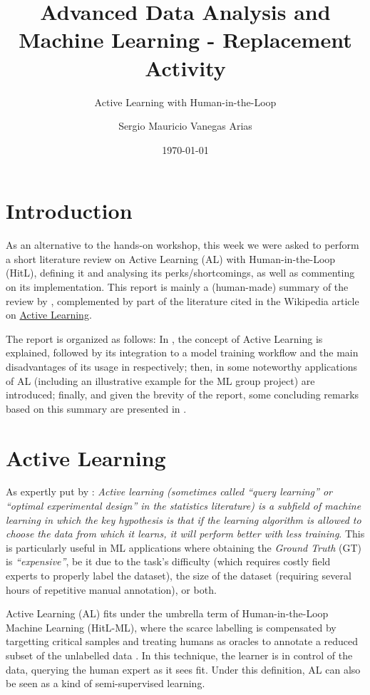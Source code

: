 \documentclass{scrartcl}
\title{Advanced Data Analysis and Machine Learning - Replacement Activity}
\subtitle{Active Learning with Human-in-the-Loop}
\author{Sergio Mauricio Vanegas Arias}
\date{\today}
\begin{document}
  \maketitle

\section{Introduction}

  As an alternative to the hands-on workshop, this week we were asked to perform a short literature review on Active Learning (AL) with Human-in-the-Loop (HitL), defining it and analysing its perks/shortcomings, as well as commenting on its implementation. This report is mainly a (human-made) summary of the review by \textcite{mosqueira2023human}, complemented by part of the literature cited in the Wikipedia article on \href{https://en.wikipedia.org/wiki/Active_learning_(machine_learning)}{Active Learning}.
  
  The report is organized as follows: In , the concept of Active Learning is explained, followed by its integration to a model training workflow and the main disadvantages of its usage in  respectively; then, in  some noteworthy applications of AL (including an illustrative example for the ML group project) are introduced; finally, and given the brevity of the report, some concluding remarks based on this summary are presented in .

\section{Active Learning} \label{sec:definition}

  As expertly put by \textcite{settles.tr09}: \emph{Active learning (sometimes called \emph{``query learning''} or \emph{``optimal experimental design''} in the statistics literature) is a subfield of machine learning in which the key hypothesis is that if the learning algorithm is allowed to choose the data from which it learns, it will perform better with less training}. This is particularly useful in ML applications where obtaining the \textit{Ground Truth} (GT) is \emph{``expensive''}, be it due to the task's difficulty (which requires costly field experts to properly label the dataset), the size of the dataset (requiring several hours of repetitive manual annotation), or both.
  
  Active Learning (AL) fits under the umbrella term of Human-in-the-Loop Machine Learning (HitL-ML), where the scarce labelling is compensated by targetting critical samples and treating humans as oracles to annotate a reduced subset of the unlabelled data \autocite{mosqueira2023human}. In this technique, the learner is in control of the data, querying the human expert as it sees fit. Under this definition, AL can also be seen as a kind of semi-supervised learning.
\end{document}
